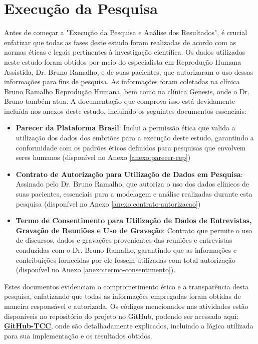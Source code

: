 
\chapter[Execução da Pesquisa]{Execução da Pesquisa} 

Antes de começar a "Execução da Pesquisa e Análise dos Resultados", é crucial enfatizar que todas as fases deste estudo foram realizadas de acordo com as normas éticas e legais pertinentes à investigação científica. Os dados utilizados neste estudo foram obtidos por meio do especialista em Reprodução Humana Assistida, Dr. Bruno Ramalho, e de suas pacientes, que autorizaram o uso dessas informações para fins de pesquisa. As informações foram coletadas na clínica Bruno Ramalho Reprodução Humana, bem como na clínica Genesis, onde o Dr. Bruno também atua. A documentação que comprova isso está devidamente incluída nos anexos deste estudo, incluindo os seguintes documentos essenciais:
\begin{itemize}
  \item \textbf{Parecer da Plataforma Brasil}: Inclui a permissão ética que valida a utilização dos dados dos embriões para a execução deste estudo, garantindo a conformidade com os padrões éticos definidos para pesquisas que envolvem seres humanos (disponível no Anexo \ref{anexo:parecer-cep})
  \item \textbf{Contrato de Autorização para Utilização de Dados em Pesquisa}: Assinado pelo Dr. Bruno Ramalho, que autoriza o uso dos dados clínicos de suas pacientes, essenciais para a modelagem e análise realizadas durante esta pesquisa (disponível no Anexo \ref{anexo:contrato-autorizacao})
  \item \textbf{Termo de Consentimento para Utilização de Dados de Entrevistas, Gravação de Reuniões e Uso de Gravação}: Contrato que permite o uso de discursos, dados e gravações provenientes das reuniões e entrevistas conduzidas com o Dr. Bruno Ramalho, garantindo que as informações e contribuições fornecidas por ele fossem utilizadas com total autorização (disponível no Anexo \ref{anexo:termo-consentimento}).
\end{itemize}
Estes documentos evidenciam o comprometimento ético e a transparência desta pesquisa, enfatizando que todas as informações empregadas foram obtidas de maneira responsável e autorizada.
Os códigos mencionados nas atividades estão disponíveis no repositório do projeto no GitHub, podendo ser acessado aqui: \textbf{\href{https://github.com/sabrinaberno/TCC1}{GitHub-TCC}}, onde são detalhadamente explicados, incluindo a lógica utilizada para sua implementação e os resultados obtidos.
 

